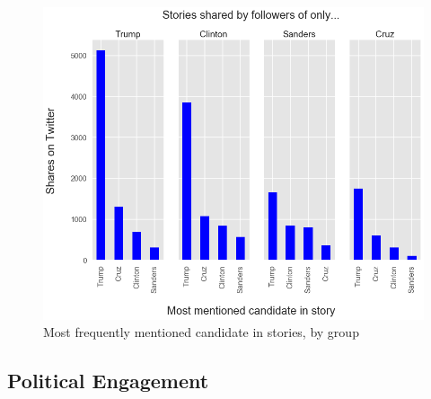 \documentclass[letterpaper]{article}
\begin{document}
\begin{figure}[htbp!] 
\centering 
 \includegraphics[width=1.0\columnwidth]{who-shares-stories-about}  
  \caption{Most frequently mentioned candidate in stories, by group
    \label{fig:who-shares-stories-about}}
\end{figure}
 
\subsection{Political Engagement}

\end{document}
